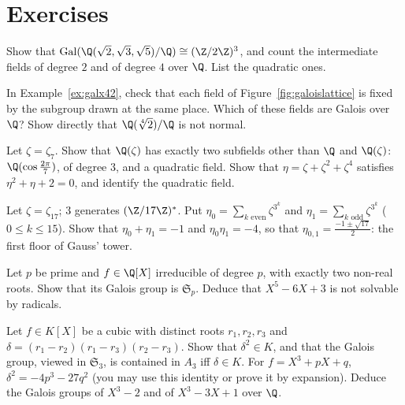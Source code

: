 \section{Exercises}

\begin{exercise}[$\star$]\label{ex:q235}
Show that $\operatorname{Gal}(\Q(\sqrt2,\sqrt3,\sqrt5)/\Q)\cong(\Z/2\Z)^3$, and count the intermediate fields of degree $2$ and of degree $4$ over $\Q$. List the quadratic ones.
\end{exercise}

\begin{exercise}[$\star\star$]\label{ex:x42check}
In Example~\ref{ex:galx42}, check that each field of Figure~\ref{fig:galoislattice} is fixed by the subgroup drawn at the same place. Which of these fields are Galois over $\Q$? Show directly that $\Q(\sqrt[4]2)/\Q$ is not normal.
\end{exercise}

\begin{exercise}[$\star\star$]\label{ex:zeta7}
Let $\zeta=\zeta_7$. Show that $\Q(\zeta)$ has exactly two subfields other than $\Q$ and $\Q(\zeta)$: $\Q(\cos\frac{2\pi}7)$, of degree $3$, and a quadratic field. Show that $\eta=\zeta+\zeta^2+\zeta^4$ satisfies $\eta^2+\eta+2=0$, and identify the quadratic field.
\end{exercise}

\begin{exercise}[$\star\star$]\label{ex:gauss17}
Let $\zeta=\zeta_{17}$; $3$ generates $(\Z/17\Z)^*$. Put $\eta_0=\sum_{k\text{ even}}\zeta^{3^k}$ and $\eta_1=\sum_{k\text{ odd}}\zeta^{3^k}$ ($0\le k\le15$). Show that $\eta_0+\eta_1=-1$ and $\eta_0\eta_1=-4$, so that $\eta_{0,1}=\frac{-1\pm\sqrt{17}}2$: the first floor of Gauss' tower.
\end{exercise}

\begin{exercise}[$\star\star$]\label{ex:sp}
Let $p$ be prime and $f\in\Q[X]$ irreducible of degree $p$, with exactly two non-real roots. Show that its Galois group is $\mathfrak S_p$. Deduce that $X^5-6X+3$ is not solvable by radicals.
\end{exercise}

\begin{exercise}[$\star\star$]\label{ex:discr}
Let $f\in K[X]$ be a cubic with distinct roots $r_1,r_2,r_3$ and $\delta=(r_1-r_2)(r_1-r_3)(r_2-r_3)$. Show that $\delta^2\in K$, and that the Galois group, viewed in $\mathfrak S_3$, is contained in $A_3$ iff $\delta\in K$. For $f=X^3+pX+q$, $\delta^2=-4p^3-27q^2$ (you may use this identity or prove it by expansion). Deduce the Galois groups of $X^3-2$ and of $X^3-3X+1$ over $\Q$.
\end{exercise}

